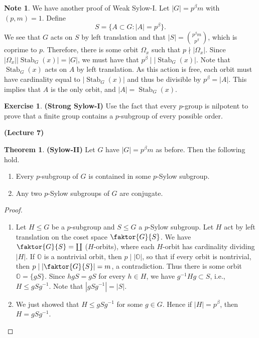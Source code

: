 \documentclass[10pt,letterpaper,cm]{nupset}
\theoremstyle{definition}
\newtheorem{note}{Note}
\newtheorem{theorem}{Theorem}
\newtheorem{exercise}{Exercise}
\newcommand{\1}{\mathbf{1}}
\newcommand{\0}{\vec 0}
\DeclareMathOperator{\stab}{Stab}
\begin{document}
\begin{note}
We have another proof of Weak Sylow-I. Let $|G| = p^{\beta}m$ with $(p, m) =1$. Define $$ S = \{A\subset G : |A| = p^{\beta}\}.$$ We see that $G$ acts on $S$ by left translation and that $|S| = {p^{\beta}m \choose p^{\beta}}$, which is coprime to $p$. Therefore, there is some orbit $\Omega_x$ such that $p \nmid  |\Omega_x|$. Since $|\Omega_x||\stab_G(x)| = |G|$, we must have that $p^{\beta} \mid |\stab_G(x)|$. Note that $\stab_G(x)$ acts on $A$ by left translation. As this action is free, each orbit must have cardinality equal to $|\stab_G(x)|$ and thus be divisible by $p^{\beta} =|A|$. This implies that $A$ is the only orbit, and $|A| = \stab_G(x)$.
\end{note}

\begin{exercise}{\textbf{(Strong Sylow-I)}}
Use the fact that every $p$-group is nilpotent to prove that a finite group contains a $p$-subgroup of every possible order.
\end{exercise}

\begin{center}
{\textbf{(Lecture 7)}} 
\end{center}

\begin{theorem}{\textbf{(Sylow-II)}} Let $G$ have $|G|= p^{\beta}m$ as before. Then the following hold.
\begin{enumerate}
\item Every $p$-subgroup of $G$ is contained in some $p$-Sylow subgroup.
\item Any two $p$-Sylow subgroups of $G$ are conjugate.
\end{enumerate}
\end{theorem}

\begin{proof} $ $
\begin{enumerate}
\item Let $H\leq G$ be a $p$-subgroup and $S\leq G$ a $p$-Sylow subgroup.  Let $H$ act by left translation on the coset space $\faktor{G}{S}$. We have $\faktor{G}{S} = \coprod$ ($H$-orbits), where each $H$-orbit has cardinality dividing $|H|$. If $\mathds{O}$ is a nontrivial orbit, then $p\mid |\mathds{O}|$, so that if every orbit is nontrivial, then $p\mid |\faktor{G}{S}| =m$, a contradiction. Thus there is some orbit $\mathds{O} = \{gS\}$. Since $hgS = gS$ for every $h\in H$, we have $g^{-1}Hg\subset S$, i.e., $H\leq gSg^{-1}$. Note that $|gSg^{-1}|=|S|$.
\item We just showed that $H\leq gSg^{-1}$ for some $g\in G$. Hence if $|H| = p^{\beta}$, then $H=gSg^{-1}$.
\end{enumerate}
\end{proof}
\end{document}
